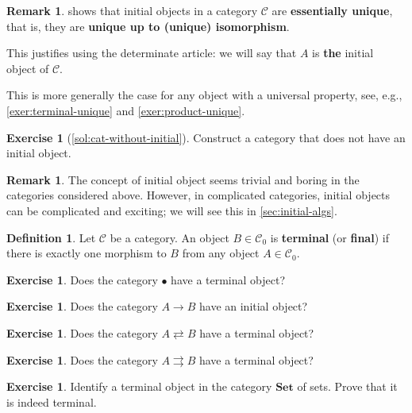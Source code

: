 \documentclass[a4paper,10pt]{scrartcl}
\theoremstyle{plain}
\theoremstyle{definition}
\newtheorem{rem}[thm]{Remark}
\newtheorem{dfn}[thm]{Definition}
\newtheorem{exer}[thm]{Exercise}
\newcommand{\Cat}[1]{\mathcal{#1}}
\newcommand{\CC}{\Cat{C}}
\newcommand{\Catb}[1]{\mathbf{#1}}
\newcommand{\SET}{\Catb{Set}}
\newcommand{\Ob}[1]{{#1}_0}
\begin{document}
\begin{rem}
   shows that initial objects in a category $\CC$ are \textbf{essentially unique}, that is, they are \textbf{unique up to (unique) isomorphism}.

  
  This justifies using the determinate article: we will say that $A$ is \textbf{the} initial object of $\CC$.

  
  This is more generally the case for any object with a universal property, see, e.g., \cref{exer:terminal-unique} and \cref{exer:product-unique}.
\end{rem}

\begin{exer}[\cref{sol:cat-without-initial}]\label{exer:cat-without-initial}
  Construct a category that does not have an initial object.
\end{exer}

\begin{rem}
  The concept of initial object seems trivial and boring in the categories considered above.
  However, in complicated categories, initial objects can be complicated and exciting;
  we will see this in \cref{sec:initial-algs}.
\end{rem}

\begin{dfn}
  Let $\CC$ be a category. An object $B \in \Ob{\CC}$ is \textbf{terminal} (or \textbf{final}) if there is exactly one morphism to $B$ from any object $A \in \Ob{\CC}$.
\end{dfn}

\begin{exer}
  Does the category $\bullet$ have a terminal object?
\end{exer}

\begin{exer}
  Does the category $A \to B$ have an initial object?
\end{exer}

\begin{exer}
  Does the category $A \rightleftarrows B$ have a terminal object?
\end{exer}

\begin{exer}
  Does the category $A \rightrightarrows B$ have a terminal object?
\end{exer}



\begin{exer}
  Identify a terminal object in the category $\SET$ of sets.
  Prove that it is indeed terminal.
\end{exer}
\end{document}
